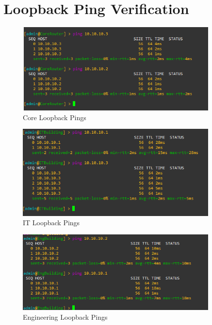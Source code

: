 \documentclass{article}
\begin{document}
	\section{Loopback Ping Verification}
		\begin{figure}[h!]
			\centering
				\includegraphics[width=0.9\textwidth]{core_loopback_pings}
				\caption{Core Loopback Pings}
		\end{figure}
		\begin{figure}[h!]
			\centering
				\includegraphics[width=0.9\textwidth]{it_loopback_pings}
				\caption{IT Loopback Pings}
		\end{figure}
		\begin{figure}[h!]
			\centering
				\includegraphics[width=0.9\textwidth]{eng_loopback_pings}
				\caption{Engineering Loopback Pings}
		\end{figure}
		\newpage
\end{document}
